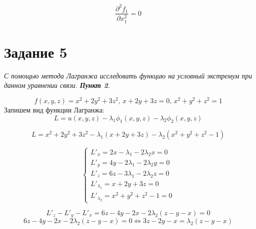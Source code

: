 \documentclass[a5paper, 10pt]{article}
\theoremstyle{definition}
\theoremstyle{plain}
\theoremstyle{remark}
\begin{document}
\begin{equation}
\frac{\partial ^ 2 f_1}{\partial x_1^2} = 0
\end{equation}










\newpage

\section{Задание 5}
\textit{С помощью метода Лагранжа исследовать функцию на условный экстремум при данном уравнении связи. \textbf{Пункт 2}.}

\begin{equation}
f(x, y, z) = x^2+2y^2+3z^2, \, x + 2y+3z=0, \, x^2 +y^2+z^2=1
\end{equation}
Запишем вид функции Лагранжа:
\begin{equation}
L = u(x, y, z) - \lambda_1 \phi_1 (x, y, z) - \lambda_2 \phi_2 (x, y, z)
\end{equation}

\begin{equation}
L = x^2+2y^2+3z^2  - \lambda_1 \left(  x + 2y+3z \right) - \lambda_2 \left( x^2 +y^2+z^2 - 1   \right)
\end{equation}

\begin{equation}
\begin{cases}
L'_x = 2x - \lambda_1 -2 \lambda_2 x = 0\\
L'_y = 4y  - 2\lambda_1  - 2\lambda_2 y = 0\\
L'_z = 6z  - 3 \lambda_1  - 2\lambda_2 z = 0\\
L'_{\lambda_1}=   x + 2y+3z = 0\\
L'_ { \lambda_2} =  x^2 +y^2+z^2 - 1 = 0
\end{cases}
\end{equation}

\begin{equation}
L'_z - L'_y - L'_x = 6z-4y-2x -2 \lambda_2 (z - y - x) = 0
\end{equation}
\begin{equation}
6z-4y-2x -2 \lambda_2 (z - y - x) = 0 \Leftrightarrow 3z-2y-x = \lambda_2 (z - y - x)
\end{equation}
\end{document}
